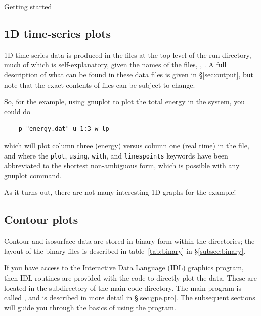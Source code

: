 \begin{chapter}{\label{cha:quickstart}Getting started}
  \subsection{1D time-series plots}
  1D time-series data is produced in the  files at the top-level
  of the run directory, much of which is self-explanatory, given the names of
  the files, \eg {}, .  A full description
  of what can be found in these data files is given in \S\ref{sec:output}, but
  note that the exact contents of files can be subject to change.
  
  So, for the  example, using gnuplot to plot the total energy
  in the system, you could do
  \begin{Verbatim}
    p "energy.dat" u 1:3 w lp
  \end{Verbatim}
  which will plot column three (energy) versus column one (real time) in the
  file, and where the \verb"plot", \verb"using", \verb"with", and
  \verb"linespoints" keywords have been abbreviated to the shortest
  non-ambiguous form, which is possible with any gnuplot command.

  As it turns out, there are not many interesting 1D graphs for the
   example!

  \subsection{\label{subsec:contour_plots}Contour plots}
  Contour and isosurface data are stored in binary form within the
   directories; the layout of the binary files is described in
  table~\ref{tab:binary} in \S\ref{subsec:binary}.

  If you have access to the Interactive Data Language (IDL) graphics program,
  then IDL routines are provided with the code to directly plot the data.
  These are located in the  subdirectory of the main code
  directory.  The main program is called , and is described in
  more detail in \S\ref{sec:gpe.pro}.  The subsequent sections will guide you
  through the basics of using the program.


\end{chapter}
